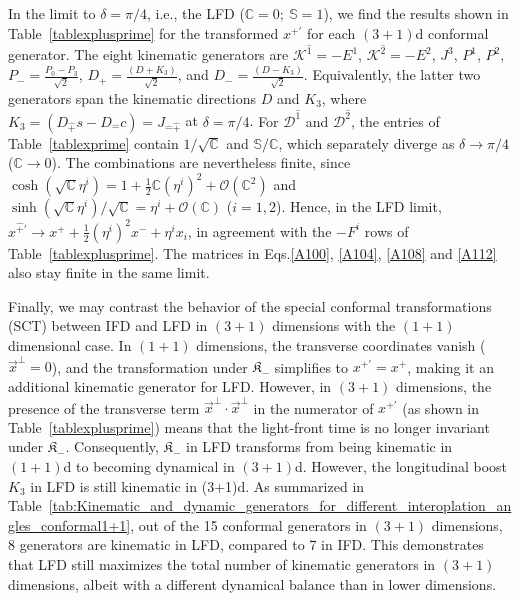 \documentclass[foundations,article,submit,pdftex,moreauthors]{Definitions/mdpi}
\begin{document}
\IFDTimeTable
\FloatBarrier

In the limit to $\delta=\pi/4$, i.e., the LFD ($\mathbb{C}=0;~\mathbb{S}=1$), we find the results shown in Table~\ref{tablexplusprime} for the transformed $x^{+\prime}$ for each $(3+1)$d conformal generator. The eight kinematic generators are $\mathcal{K}^{\hat{1}}=-E^{1}$, $\mathcal{K}^{\hat{2}}=-E^{2}$, $J^{3}$, $P^{1}$, $P^{2}$, $P_{-}=\frac{P_{0}-P_{3}}{\sqrt{2}}$, $D_{+}=\frac{(D+K_3)}{\sqrt{2}}$, and $D_{-}=\frac{(D-K_3)}{\sqrt{2}}$. Equivalently, the latter two generators span the kinematic directions $D$ and $K_3$, where $K_3=\left(D_{\hat{+}}s-D_{\hat{-}}c\right)=J_{\hat{-}\hat{+}}$ at $\delta=\pi/4$. {For $\mathcal{D}^{\hat{1}}$ and $\mathcal{D}^{\hat{2}}$, the entries of Table~\ref{tablexprime} contain $1/\sqrt{\mathbb{C}}$ and $\mathbb{S}/\mathbb{C}$, which separately diverge as $\delta\to\pi/4$ ($\mathbb{C}\to0$). The combinations are nevertheless finite, since $\cosh(\sqrt{\mathbb{C}}\eta^{i})=1+\tfrac{1}{2}\mathbb{C}(\eta^{i})^2+\mathcal{O}(\mathbb{C}^2)$ and $\sinh(\sqrt{\mathbb{C}}\eta^{i})/\sqrt{\mathbb{C}}=\eta^{i}+\mathcal{O}(\mathbb{C})$ ($i=1,2$). Hence, in the LFD limit, $x^{\hat{+}\prime}\to x^{+}+\tfrac{1}{2}(\eta^{i})^2x^{-}+\eta^{i}x_{i}$, in agreement with the $-F^{i}$ rows of Table~\ref{tablexplusprime}.}
{\color{blue} 
The matrices in Eqs.\eqref{A100}, \eqref{A104}, \eqref{A108} and \eqref{A112} also stay finite in the same limit.}


\LFDTimeTable
\FloatBarrier

Finally, we may contrast the behavior of the special conformal transformations (SCT) between IFD and LFD in $(3+1)$ dimensions with the $(1+1)$ dimensional case. In $(1+1)$ dimensions, the transverse coordinates vanish ($\vec{x}^{\perp} = 0$), and the transformation under $\mathfrak{K}_{-}$ simplifies to $x^{+\prime} = x^{+}$, making it an additional kinematic generator for LFD. However, in $(3+1)$ dimensions, the presence of the transverse term $\vec{x}^{\perp}\cdot\vec{x}^{\perp}$ in the numerator of $x^{+\prime}$ ({\color{blue}as shown in Table~\ref{tablexplusprime}}) means that the light-front time is no longer invariant under $\mathfrak{K}_{-}$. Consequently, $\mathfrak{K}_{-}$ in LFD transforms from being kinematic in $(1+1)$d to becoming dynamical in $(3+1)$d.
However, the longitudinal boost $K_3$
in LFD is still kinematic in (3+1)d.  
As summarized in Table~\ref{tab:Kinematic_and_dynamic_generators_for_different_interoplation_angles_conformal1+1}, out of the 15 conformal generators in $(3+1)$ dimensions, 8 generators are kinematic in LFD, compared to 7 in IFD. This demonstrates that LFD still maximizes the total number of kinematic generators in $(3+1)$ dimensions, albeit with a different dynamical balance than in lower dimensions.
\end{document}
